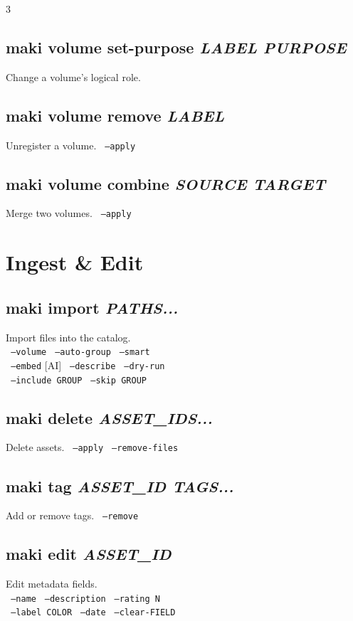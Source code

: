 \documentclass[a4paper,landscape,8pt]{article}
\newcommand{\opt}[1]{\texttt{\scriptsize\color{maki-stone} #1}}
\newcommand{\ai}{\textcolor{maki-teal}{\scriptsize [AI]}}
\begin{document}
\begin{multicols}{3}
\subsection{maki volume set-purpose \textit{LABEL PURPOSE}}
Change a volume's logical role.

\subsection{maki volume remove \textit{LABEL}}
Unregister a volume. \opt{--apply}

\subsection{maki volume combine \textit{SOURCE TARGET}}
Merge two volumes. \opt{--apply}

\section{Ingest \& Edit}

\subsection{maki import \textit{PATHS...}}
Import files into the catalog. \\
\opt{--volume} \opt{--auto-group} \opt{--smart} \\
\opt{--embed} \ai{} \opt{--describe} \opt{--dry-run} \\
\opt{--include GROUP} \opt{--skip GROUP}

\subsection{maki delete \textit{ASSET\_IDS...}}
Delete assets. \opt{--apply} \opt{--remove-files}

\subsection{maki tag \textit{ASSET\_ID TAGS...}}
Add or remove tags. \opt{--remove}

\subsection{maki edit \textit{ASSET\_ID}}
Edit metadata fields. \\
\opt{--name} \opt{--description} \opt{--rating N} \\
\opt{--label COLOR} \opt{--date} \opt{--clear-FIELD}


\end{multicols}
\end{document}
